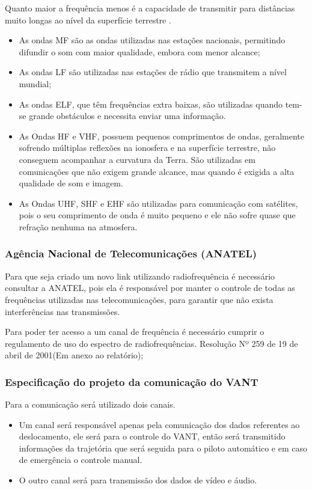 Quanto maior a frequência menos é a capacidade de transmitir para distâncias muito longas ao nível da superfície terrestre \cite{VALLE1}. 

\begin{itemize}
	\item As ondas MF são as ondas utilizadas nas estações nacionais, permitindo difundir o som com maior qualidade, embora com menor alcance;
	\item As ondas LF são utilizadas nas estações de rádio que transmitem a nível mundial;
	\item As ondas ELF, que têm frequências extra baixas, são utilizadas quando tem-se grande obstáculos e necessita enviar uma informação. 
	\item As Ondas HF e VHF, possuem pequenos comprimentos de ondas, geralmente sofrendo múltiplas reflexões na ionosfera e na superfície terrestre, não conseguem acompanhar a curvatura da Terra. São utilizadas em comunicações que não exigem grande alcance, mas quando é exigida a alta qualidade de som e imagem.
	\item As Ondas UHF, SHF e EHF são utilizadas para comunicação com satélites, pois o seu comprimento de onda é muito pequeno e ele não sofre quase que refração nenhuma na atmosfera. 
\end{itemize} 

\subsubsection{Agência Nacional de Telecomunicações (ANATEL)}

Para que seja criado um novo link utilizando radiofrequência é necessário consultar a ANATEL, pois ela é responsável por manter o controle de todas as frequências utilizadas nas telecomunicações, para garantir que não exista interferências nas transmissões.


Para poder ter acesso a um canal de frequência é necessário cumprir o regulamento de uso do espectro de radiofrequências. Resolução Nº 259 de 19 de abril de 2001(Em anexo ao relatório);

\subsubsection{Especificação do projeto da comunicação do VANT}

Para a comunicação será utilizado dois canais.

\begin{itemize}
	\item Um canal será responsável apenas pela comunicação dos dados referentes ao deslocamento, ele será para o controle do VANT, então será transmitido informações da trajetória que será seguida para o piloto automático e em caso de emergência o controle manual.
	\item O outro canal será para transmissão dos dados de vídeo e áudio.
\end{itemize}

